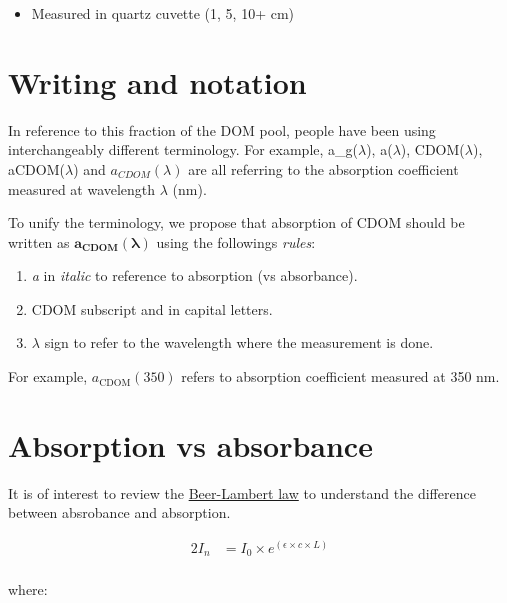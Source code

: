 \documentclass[]{book}
\providecommand{\tightlist}{%
  \setlength{\itemsep}{0pt}\setlength{\parskip}{0pt}}
\theoremstyle{definition}
\theoremstyle{definition}
\theoremstyle{remark}
\begin{document}
\begin{itemize}
\tightlist
\item
  Measured in quartz cuvette (1, 5, 10+ cm)
\end{itemize}

\section{Writing and notation}\label{writing-and-notation}

In reference to this fraction of the DOM pool, people have been using
interchangeably different terminology. For example, a\_g(\(\lambda\)),
a(\(\lambda\)), CDOM(\(\lambda\)), aCDOM(\(\lambda\)) and
\(a_{CDOM}(\lambda)\) are all referring to the absorption coefficient
measured at wavelength \(\lambda\) (nm).

To unify the terminology, we propose that absorption of CDOM should be
written as \(\mathbf{a_{\text{CDOM}}(\lambda)}\) using the followings
\emph{rules}:

\begin{enumerate}
\def\labelenumi{\arabic{enumi}.}
\tightlist
\item
  \emph{a} in \emph{italic} to reference to absorption (vs absorbance).
\item
  CDOM subscript and in capital letters.
\item
  \(\lambda\) sign to refer to the wavelength where the measurement is
  done.
\end{enumerate}

For example, \(a_{\text{CDOM}}(350)\) refers to absorption coefficient
measured at 350 nm.

\section{Absorption vs absorbance}\label{absorption-vs-absorbance}

It is of interest to review the
\href{http://www.chemguide.co.uk/analysis/uvvisible/beerlambert.html}{Beer-Lambert
law} to understand the difference between absrobance and absorption.

\begin{alignat}{2}
\label{eq:abs1}
    I_n &= I_0 \times e^{(\epsilon \times c \times L)}\\
\end{alignat}

where:
\end{document}
